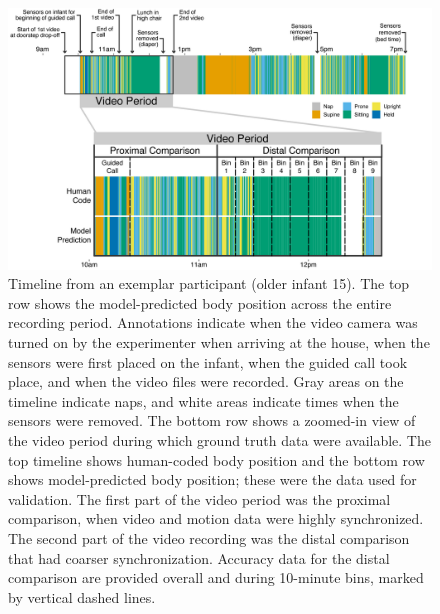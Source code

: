 \documentclass[
  man]{apa6}
\begin{document}
\begin{figure}

{\centering \includegraphics[width=0.99\linewidth]{figures/timeline} 

}

\caption{Timeline from an exemplar participant (older infant 15). The top row shows the model-predicted body position across the entire recording period. Annotations indicate when the video camera was turned on by the experimenter when arriving at the house, when the sensors were first placed on the infant, when the guided call took place, and when the video files were recorded. Gray areas on the timeline indicate naps, and white areas indicate times when the sensors were removed. The bottom row shows a zoomed-in view of the video period during which ground truth data were available. The top timeline shows human-coded body position and the bottom row shows model-predicted body position; these were the data used for validation. The first part of the video period was the proximal comparison, when video and motion data were highly synchronized. The second part of the video recording was the distal comparison that had coarser synchronization. Accuracy data for the distal comparison are provided overall and during 10-minute bins, marked by vertical dashed lines.}\label{fig:exemplar-timeline}
\end{figure}
\end{document}

